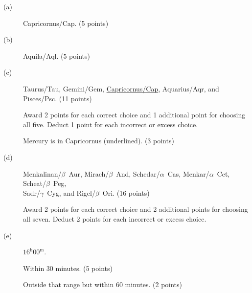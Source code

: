 \begin{description}
\item[(a)] Capricornus/Cap. \hfill(5 points)

\item[(b)] Aquila/Aql. \hfill(5 points)

\item[(c)] Taurus/Tau, Gemini/Gem, \underline{Capricornus/Cap}, Aquarius/Aqr,
  and Pisces/Psc. \hfill(11 points)

  Award 2 points for each correct choice and 1 additional point for choosing
  all five. Deduct 1 point for each incorrect or excess choice.

  Mercury is in Capricornus (underlined). \hfill(3 points)

\item[(d)] Menkalinan/$\beta$~Aur, Mirach/$\beta$~And, Schedar/$\alpha$~Cas,
  Menkar/$\alpha$~Cet, Scheat/$\beta$~Peg,\\
  Sadr/$\gamma$~Cyg, and Rigel/$\beta$~Ori. \hfill(16 points)

  Award 2 points for each correct choice and 2 additional points for choosing
  all seven. Deduct 2 points for each incorrect or excess choice.

\item[(e)] $16^{\mathrm{h}}00^{\mathrm{m}}$.

  Within 30 minutes. \hfill(5 points)

  Outside that range but within 60 minutes. \hfill(2 points)
\end{description}
